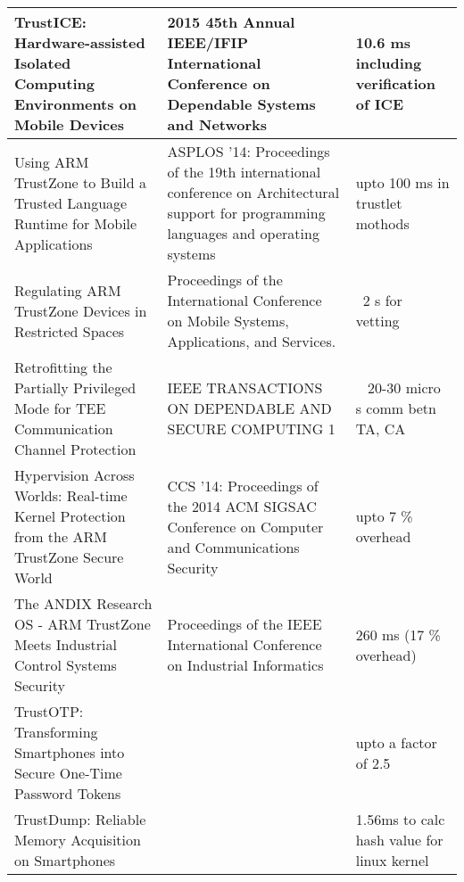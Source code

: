 \documentclass[conference]{IEEEtran}
\begin{document}
\begin{table*}[t]
\begin{center}
\begin{tabular}{ |p{}||p{}|p{}|  }
            TrustICE: Hardware-assisted Isolated Computing Environments on Mobile Devices              & 2015 45th Annual IEEE/IFIP International Conference on Dependable Systems and Networks                                                & 10.6 ms including verification of ICE                        \\ \hline
            Using ARM TrustZone to Build a Trusted Language Runtime for Mobile Applications            & ASPLOS '14: Proceedings of the 19th international conference on Architectural support for programming languages and operating systems & upto 100 ms in trustlet mothods                              \\ \hline
            Regulating ARM TrustZone Devices in Restricted Spaces                                      & Proceedings of the International Conference on Mobile Systems, Applications, and Services.                                            & ~2 s for vetting                                             \\ \hline
            Retrofitting the Partially Privileged Mode for TEE Communication Channel Protection        & IEEE TRANSACTIONS ON DEPENDABLE AND SECURE COMPUTING 1                                                                                & ~ 20-30 micro s comm betn TA, CA                             \\ \hline
            Hypervision Across Worlds: Real-time Kernel Protection from the ARM TrustZone Secure World & CCS '14: Proceedings of the 2014 ACM SIGSAC Conference on Computer and Communications Security                                        & upto 7 \% overhead                                           \\ \hline
            The ANDIX Research OS - ARM TrustZone Meets Industrial Control Systems Security            & Proceedings of the IEEE International Conference on Industrial Informatics                                                            & 260 ms (17 \% overhead)                                      \\ \hline
            TrustOTP: Transforming Smartphones into Secure One-Time Password Tokens                    &                                                                                                                                       & upto a factor of 2.5                                         \\ \hline
            TrustDump: Reliable Memory Acquisition on Smartphones                                      &                                                                                                                                       & 1.56ms to calc hash value for linux kernel                   \\ \hline

\end{tabular}
\end{center}
\end{table*}
\end{document}
